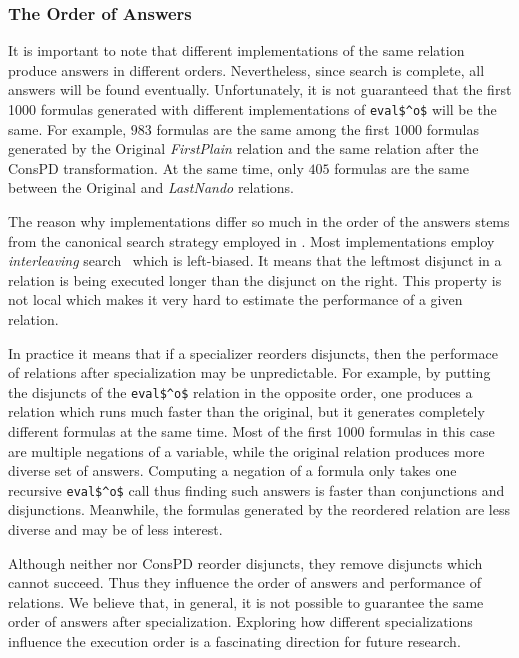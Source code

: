 \subsubsection{The Order of Answers}

It is important to note that different implementations of the same \mk relation produce answers in different orders.
Nevertheless, since \mk search is complete, all answers will be found eventually.
Unfortunately, it is not guaranteed that the first 1000 formulas generated with different implementations of \lstinline{eval$^o$} will be the same.
For example, $983$ formulas are the same among the first $1000$ formulas generated by the Original \emph{FirstPlain} relation and the same relation after the ConsPD transformation.
At the same time, only $405$ formulas are the same between the Original and \ecce \emph{LastNando} relations.

The reason why implementations differ so much in the order of the answers stems from the canonical search strategy employed in \mk.
Most \mk implementations employ \emph{interleaving} search~\cite{10.1145/1090189.1086390} which is left-biased.
It means that the leftmost disjunct in a relation is being executed longer than the disjunct on the right.
This property is not local which makes it very hard to estimate the performance of a given relation.

In practice it means that if a specializer reorders disjuncts, then the performace of relations after specialization may be unpredictable.
For example, by putting the disjuncts of the \lstinline{eval$^o$} relation in the opposite order, one produces a relation which runs much faster than the original, but it generates completely different formulas at the same time.
Most of the first 1000 formulas in this case are multiple negations of a variable, while the original relation produces more diverse set of answers.
Computing a negation of a formula only takes one recursive \lstinline{eval$^o$} call thus finding such answers is faster than conjunctions and disjunctions.
Meanwhile, the formulas generated by the reordered relation are less diverse and may be of less interest.

Although neither \ecce nor ConsPD reorder disjuncts, they remove disjuncts which cannot succeed.
Thus they influence the order of answers and performance of relations.
We believe that, in general, it is not possible to guarantee the same order of answers after specialization.
Exploring how different specializations influence the execution order is a fascinating direction for future research.


